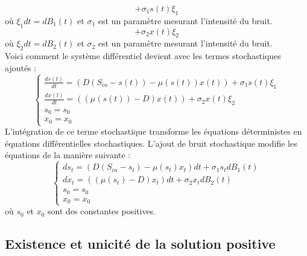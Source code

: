 \documentclass[12pt,a4paper]{report}%
\begin{document}
\[ + \sigma_1 s(t) \xi_1 \]
où \(\xi_1 dt = dB_1(t)\) et \(\sigma_1\) est un paramètre mesurant l'intensité du bruit.
\[ + \sigma_2 x(t) \xi_2 \]
où \(\xi_2 dt = dB_2(t)\) et \(\sigma_2\) est un paramètre mesurant l'intensité du bruit.\\
Voici comment le système différentiel devient avec les termes stochastiques ajoutés :
\begin{equation}
	\begin{cases}
	\frac{ds(t)}{dt} = \left( D \left(S_{in}-s(t)\right) - \mu(s(t))x(t)\right) + \sigma_1 s(t) \xi_1  \\
	\frac{dx(t)}{dt} = \left((\mu(s(t))-D) x(t)\right)   + \sigma_2 x(t) \xi_2\\
		s_0 = s_0 \\
		x_0 = x_0
	\end{cases}
\end{equation}
L'intégration de ce terme stochastique transforme les équations déterministes en équations différentielles stochastiques. L'ajout de bruit stochastique modifie les équations de la manière suivante :
\begin{equation}\label{DS}
	\begin{cases}
		ds_t = \left( D \left(S_{in}-s_t\right) - \mu(s_t)x_t\right) dt + \sigma_1 s_t dB_1(t) \\
		dx_t = \left((\mu(s_t)-D) x_t\right) dt + \sigma_2 x_t dB_2(t)\\
		s_0 = s_0 \\
		x_0 = x_0
	\end{cases}
\end{equation}
où \(s_0\) et \(x_0\) sont des constantes positives.
\subsection{Existence et unicité de la solution positive}
\end{document}
